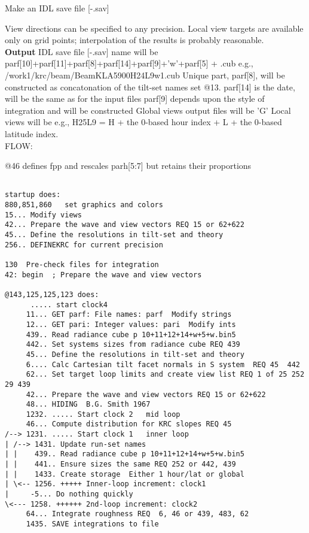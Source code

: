 \documentclass{article}
\begin{document}
Make an IDL save file [-.sav] 
 
View directions can be specified to any precision. Local view targets are
available only on grid points; interpolation of the results is probably
reasonable.
\\ \textbf{Output}  IDL save file [-.sav] 
\qi  name will be  parf[10]+parf[11]+parf[8]+parf[14]+parf[9]+'w'+parf[5]  + .cub
\qiii e.g., /work1/krc/beam/BeamKLA5900H24L9w1.cub
\qii Unique part, parf[8], will be constructed as concatonation of the tilt-set names set @13.
\qii parf[14] is the date, will be the same as for the input files
\qii parf[9] depends upon the style of integration and will be constructed
\qiii  Global views output files will be 'G' 
\qiii Local views will be  e.g., H25L9 =  H + the 0-based hour index + L + the 0-based latitude index.
\\ FLOW:

 @46 defines fpp and rescales parh[5:7] but retains their proportions

\vspace{-3.mm}  %
\begin{verbatim}

startup does:
880,851,860   set graphics and colors
15... Modify views 
42... Prepare the wave and view vectors REQ 15 or 62+622
45... Define the resolutions in tilt-set and theory 
256.. DEFINEKRC for current precision 

130  Pre-check files for integration
42: begin  ; Prepare the wave and view vectors 

@143,125,125,123 does:
      ..... start clock4
     11... GET parf: File names: parf  Modify strings
     12... GET pari: Integer values: pari  Modify ints
     439.. Read radiance cube p 10+11+12+14+w+5+w.bin5
     442.. Set systems sizes from radiance cube REQ 439
     45... Define the resolutions in tilt-set and theory 
     6.... Calc Cartesian tilt facet normals in S system  REQ 45  442
     62... Set target loop limits and create view list REQ 1 of 25 252 29 439
     42... Prepare the wave and view vectors REQ 15 or 62+622
     48... HIDING  B.G. Smith 1967
     1232. ..... Start clock 2   mid loop
     46... Compute distribution for KRC slopes REQ 45
/--> 1231. ..... Start clock 1   inner loop
| /--> 1431. Update run-set names
| |    439.. Read radiance cube p 10+11+12+14+w+5+w.bin5
| |    441.. Ensure sizes the same REQ 252 or 442, 439
| |    1433. Create storage  Either 1 hour/lat or global
| \<-- 1256. +++++ Inner-loop increment: clock1
|     -5... Do nothing quickly
\<--- 1258. ++++++ 2nd-loop increment: clock2
     64... Integrate roughness REQ  6, 46 or 439, 483, 62
     1435. SAVE integrations to file
\end{verbatim}
\end{document}
